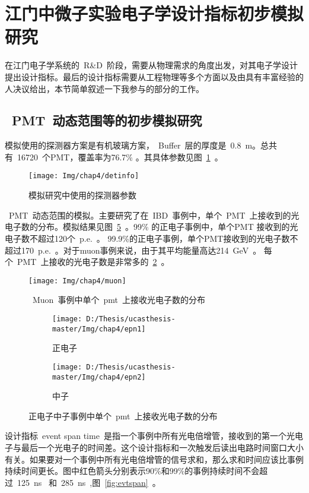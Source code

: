 \section{江门中微子实验电子学设计指标初步模拟研究}
在江门电子学系统的~R\&D~阶段，需要从物理需求的角度出发，对其电子学设计提出设计指标。最后的设计指标需要从工程物理等多个方面以及由具有丰富经验的人决议给出，本节简单叙述一下我参与的部分的工作。
\subsection{~PMT~动态范围等的初步模拟研究}
模拟使用的探测器方案是有机玻璃方案，~Buffer~层的厚度是~0.8~m。总共有~16720~个PMT，覆盖率为76.7\% 。其具体参数见图~\ref{fig:detinfo}~。\\
\begin{figure}[!htbp]
  \centering
   \texttt{[image: Img/chap4/detinfo]}
    \caption{模拟研究中使用的探测器参数}
  \label{fig:detinfo}
\end{figure}

~PMT~动态范围的模拟。主要研究了在~IBD~事例中，单个~PMT~上接收到的光电子数的分布。模拟结果见图~\ref{fig:epn}~。99\% 的正电子事例中，单个PMT 接收到的光电子数不超过120个~p.e.~。
 99.9\%的正电子事例，单个PMT接收到的光电子数不超过170~p.e.~。对于muon事例来说，由于其平均能量高达214~GeV~。 每个~PMT~上接收的光电子数是非常多的~\ref{fig:muon}~。

 \begin{figure}[!htbp]
  \centering
   \texttt{[image: Img/chap4/muon]}
    \caption{~Muon~事例中单个~pmt~上接收光电子数的分布}
  \label{fig:muon}
\end{figure}

\begin{figure}[!htbp]
  \centering
  \begin{subfigure}[b]{\MySubFactor\textwidth}
    \texttt{[image: D:/Thesis/ucasthesis-master/Img/chap4/epn1]}
    \caption{正电子}
    \label{fig:epn_1}
  \end{subfigure}%
  \quad\quad\quad\quad\quad\quad%
  \begin{subfigure}[b]{\MySubFactor\textwidth}
    \texttt{[image: D:/Thesis/ucasthesis-master/Img/chap4/epn2]}
    \caption{中子}
    \label{fig:epn_2}
  \end{subfigure}
    \caption{正电子中子事例中单个~pmt~上接收光电子数的分布}
  \label{fig:epn}
\end{figure}
 设计指标~event span time~是指一个事例中所有光电倍增管，接收到的第一个光电子与最后一个光电子的时间差。这个设计指标和一次触发后读出电路时间窗口大小有关。如果要对一个事例中所有光电倍增管的信号求和，那么求和时间应该比事例持续时间更长。图中红色箭头分别表示90\%和99\%的事例持续时间不会超过~125~ns~ 和~285~ns~,图~\ref{fig:evtspan}~。


